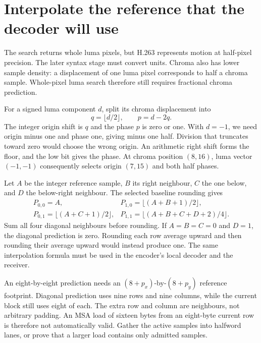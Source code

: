 

\section{Interpolate the reference that the decoder will use}

The search returns whole luma pixels, but H.263 represents motion at half-pixel
precision. The later syntax stage must convert units. Chroma also has lower
sample density: a displacement of one luma pixel corresponds to half a chroma
sample. Whole-pixel luma search therefore still requires fractional chroma
prediction.

For a signed luma component $d$, split its chroma displacement into
\[
  q=\lfloor d/2\rfloor,\qquad p=d-2q.
\]
The integer origin shift is $q$ and the phase $p$ is zero or one. With $d=-1$,
we need origin minus one and phase one, giving minus one half. Division that
truncates toward zero would choose the wrong origin. An arithmetic right shift
forms the floor, and the low bit gives the phase. At chroma position $(8,16)$,
luma vector $(-1,-1)$ consequently selects origin $(7,15)$ and both half phases.

Let $A$ be the integer reference sample, $B$ its right neighbour, $C$ the one
below, and $D$ the below-right neighbour. The selected baseline rounding gives
\[
  \begin{array}{ll}
    P_{0,0}=A,                       & P_{1,0}=\lfloor(A+B+1)/2\rfloor, \\[2pt]
    P_{0,1}=\lfloor(A+C+1)/2\rfloor, &
    P_{1,1}=\lfloor(A+B+C+D+2)/4\rfloor.
  \end{array}
\]
Sum all four diagonal neighbours before rounding. If $A=B=C=0$ and $D=1$,
the diagonal prediction is zero. Rounding each row average upward and then
rounding their average upward would instead produce one. The same interpolation
formula must be used in the encoder's local decoder and the receiver.



An eight-by-eight prediction needs an $(8+p_x)$-by-$(8+p_y)$ reference footprint.
Diagonal prediction uses nine rows and nine columns, while the current block
still uses eight of each. The extra row and column are neighbours, not arbitrary
padding. An MSA load of sixteen bytes from an eight-byte current row is therefore
not automatically valid. Gather the active samples into halfword lanes, or prove
that a larger load contains only admitted samples.

